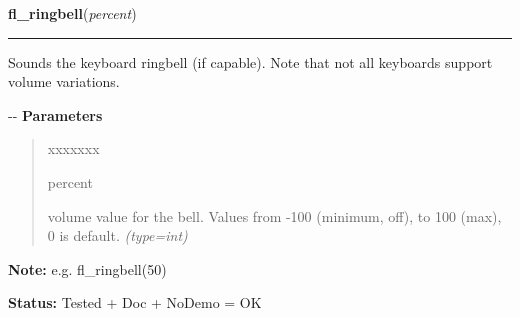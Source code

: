    \label{xformslib:flbasic:fl_ringbell}

    \vspace{0.5ex}

\hspace{.8\funcindent}\begin{boxedminipage}{\funcwidth}

    \raggedright \textbf{fl\_ringbell}(\textit{percent})

    \vspace{-1.5ex}

    \rule{\textwidth}{0.5\fboxrule}
\setlength{\parskip}{2ex}

Sounds the keyboard ringbell (if capable). Note that not all
keyboards support volume variations.

-{}-
\setlength{\parskip}{1ex}
      \textbf{Parameters}
      \vspace{-1ex}

      \begin{quote}
        \begin{Ventry}{xxxxxxx}

          \item[percent]


volume value for the bell. Values from -100 (minimum, off), to 100
(max), 0 is default.
            {\it (type=int)}

        \end{Ventry}

      \end{quote}

\textbf{Note:} 
e.g. fl\_ringbell(50)


\textbf{Status:} 
Tested + Doc + NoDemo = OK


    \end{boxedminipage}

    \label{xformslib:flbasic:fl_gettime}

    \vspace{0.5ex}

